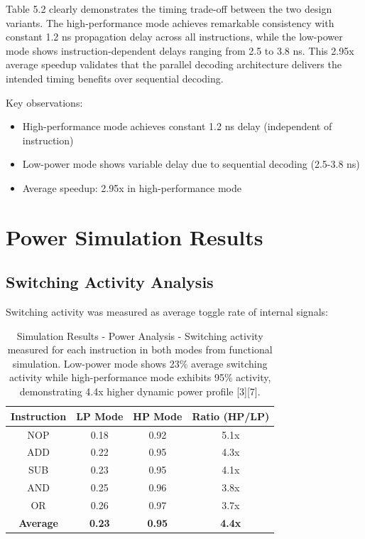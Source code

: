 \documentclass[15pt,a4paper]{report}
\begin{document}
Table 5.2 clearly demonstrates the timing trade-off between the two design variants. The high-performance mode achieves remarkable consistency with constant 1.2 ns propagation delay across all instructions, while the low-power mode shows instruction-dependent delays ranging from 2.5 to 3.8 ns. This 2.95x average speedup validates that the parallel decoding architecture delivers the intended timing benefits over sequential decoding.

Key observations:
\begin{itemize}
    \item High-performance mode achieves constant 1.2 ns delay (independent of instruction)
    \item Low-power mode shows variable delay due to sequential decoding (2.5-3.8 ns)
    \item Average speedup: 2.95x in high-performance mode
\end{itemize}

\section{Power Simulation Results}

\subsection{Switching Activity Analysis}

Switching activity was measured as average toggle rate of internal signals:

\begin{table}[H]
    \centering
    \begin{tabular}{|c|c|c|c|}
        \hline
        \textbf{Instruction} & \textbf{LP Mode} & \textbf{HP Mode} & \textbf{Ratio (HP/LP)} \\
        \hline
        NOP & 0.18 & 0.92 & 5.1x \\
        \hline
        ADD & 0.22 & 0.95 & 4.3x \\
        \hline
        SUB & 0.23 & 0.95 & 4.1x \\
        \hline
        AND & 0.25 & 0.96 & 3.8x \\
        \hline
        OR & 0.26 & 0.97 & 3.7x \\
        \hline
        \textbf{Average} & \textbf{0.23} & \textbf{0.95} & \textbf{4.4x} \\
        \hline
    \end{tabular}
    \label{tab:power_analysis}
    \caption{Simulation Results - Power Analysis - Switching activity measured for each instruction in both modes from functional simulation. Low-power mode shows 23\% average switching activity while high-performance mode exhibits 95\% activity, demonstrating 4.4x higher dynamic power profile [3][7].}
\end{table}
\end{document}
